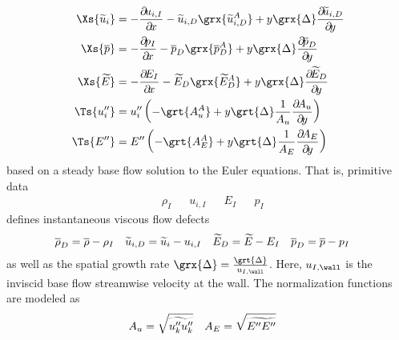 {\begin{subequations}
\begin{align}
\Xs{\fav{u}_i} &=
    - \pp{u_{i,I}}{x}
    - \fav{u}_{i,D} \grx{\fav{u}_{i,D}^A}
    + y \grx{\Delta} \pp{\fav{u}_{i,D}}{y}
\\
\Xs{\mean{p}} &=
    - \pp{p_I}{x}
    - \mean{p}_D \grx{\mean{p}_D^A}
    + y \grx{\Delta} \pp{\mean{p}_D}{y}
\\
\Xs{\fav{E}} &=
    - \pp{E_I}{x}
    -\fav{E}_D \grx{\fav{E}_D^A}
    + y \grx{\Delta} \pp{\fav{E}_D}{y}
\\
\Ts{\ffluc{u}_i} &=
    \ffluc{u}_i
       \left(
	 - \grt{A_u^A}
      + y \grt{\Delta}
             \frac{1}{A_{u}} \pp{A_{u}}{y}
         \right)
\\
\Ts{\ffluc{E}} &=
     \ffluc{E}
       \left(
        - \grt{A_E^A}
      + y \grt{\Delta}
             \frac{1}{A_{E}} \pp{A_{E}}{y}
         \right)
\end{align}
\end{subequations}
%
based on a steady base flow solution to the Euler equations.  That is,
primitive data
\begin{align*}
    &\rho_{I} & &u_{i,I} & &E_{I} & &p_{I}
\end{align*}
%
defines instantaneous viscous flow defects
%
\begin{align}
    \overline{\rho}_D &= \overline{\rho} - \rho_I
&   \widetilde{u}_{i,D} &= \widetilde{u}_i - u_{i,I}
&   \widetilde{E}_D &= \widetilde{E} - E_I
&   \overline{p}_D &= \overline{p} - p_I
\end{align}
%
as well as the spatial growth rate $\grx{\Delta}=\frac{\grt{\Delta}}{u_{I,\wall}}$.
Here, $u_{I,\wall}$ is the inviscid base flow streamwise velocity at the wall.
%
The normalization functions are modeled as
%
\begin{align}
  A_u&=\sqrt{\widetilde{u_k'' u_k''}}
& A_E&=\sqrt{\widetilde{E'' E''}}
\end{align}

}
